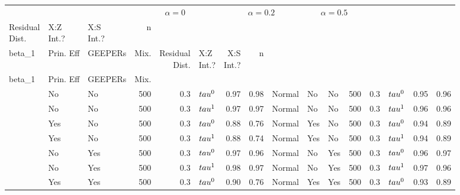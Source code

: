 
\begin{tabular}[t]{lllrrlrrlllrrlrr}
\toprule
\multicolumn{3}{c}{ } & \multicolumn{3}{c}{$\alpha=0$} & \multicolumn{3}{c}{$\alpha=0.2$} & \multicolumn{3}{c}{$\alpha=0.5$} \\
\cmidrule(l{3pt}r{3pt}){4-6} \cmidrule(l{3pt}r{3pt}){7-9} \cmidrule(l{3pt}r{3pt}){10-12}
\makecell[l]{Residual\\Dist.} & \makecell[c]{X:Z\\Int.?} & \makecell[r]{X:S\\Int.?} & n & \\beta_1 & Prin. Eff & GEEPERs & Mix. & \makecell[r]{Residual\\Dist.} & \makecell[l]{X:Z\\Int.?} & \makecell[c]{X:S\\Int.?} & n & \\beta_1 & Prin. Eff & GEEPERs & Mix.\\
\midrule
 & No & No & 500 & 0.3 & $\\tau^0$ & 0.97 & 0.98 & Normal & No & No & 500 & 0.3 & $\\tau^0$ & 0.95 & 0.96\\

 & No & No & 500 & 0.3 & $\\tau^1$ & 0.97 & 0.97 & Normal & No & No & 500 & 0.3 & $\\tau^1$ & 0.96 & 0.96\\

 & Yes & No & 500 & 0.3 & $\\tau^0$ & 0.88 & 0.76 & Normal & Yes & No & 500 & 0.3 & $\\tau^0$ & 0.94 & 0.89\\

 & Yes & No & 500 & 0.3 & $\\tau^1$ & 0.88 & 0.74 & Normal & Yes & No & 500 & 0.3 & $\\tau^1$ & 0.94 & 0.89\\

 & No & Yes & 500 & 0.3 & $\\tau^0$ & 0.97 & 0.96 & Normal & No & Yes & 500 & 0.3 & $\\tau^0$ & 0.96 & 0.97\\

 & No & Yes & 500 & 0.3 & $\\tau^1$ & 0.98 & 0.97 & Normal & No & Yes & 500 & 0.3 & $\\tau^1$ & 0.97 & 0.96\\

 & Yes & Yes & 500 & 0.3 & $\\tau^0$ & 0.90 & 0.76 & Normal & Yes & Yes & 500 & 0.3 & $\\tau^0$ & 0.93 & 0.89\\


\end{tabular}

